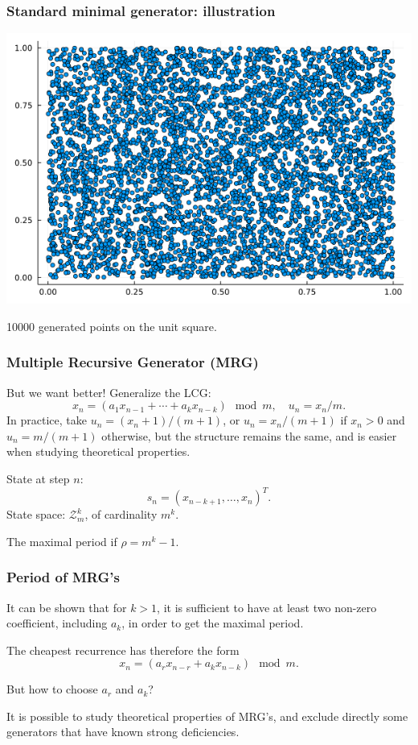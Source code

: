 \documentclass{beamer}
\begin{document}
	\begin{frame}
		\frametitle{Standard minimal generator: illustration}
		\begin{center}
			\includegraphics[width=0.8\linewidth]{imgs/lcg.png}
			
			10000 generated points on the unit square.
		\end{center}
		
	\end{frame}
	
	\begin{frame}
		\frametitle{Multiple Recursive Generator (MRG)}
		
		But we want better! Generalize the LCG:
		\[
		x_n = (a_1 x_{n-1} + \cdots + a_k x_{n-k}) \mod {m}, \quad  
		u_n = x_n / m.
		\]
		In practice, take $u_n = (x_n + 1) / (m+1)$, or $u_n =
		x_n/(m+1)$ if $x_n>0$ and $u_n = m/(m+1)$ otherwise, but the structure
		remains the same, and is easier when studying theoretical properties.
		
		\mbox{}
		
		State at step $n$:
		\[
		s_n = (x_{n-k+1},\dots,x_n)^T.
		\]
		State space: $\mathcal{Z}_m^k$, of cardinality $m^k$.
		
		\mbox{}
		
		The maximal period if $\rho = m^k-1$.
		
	\end{frame}
	
	\begin{frame}
		\frametitle{Period of MRG's}
		
		It can be shown that for $k > 1$, it is sufficient to have at least
		two non-zero coefficient, including $a_k$, in order to get the maximal
		period.
		
		\mbox{}
		
		The cheapest recurrence has therefore the form
		\[
		x_n = (a_r x_{n-r} + a_k x_{n-k}) \mod m.
		\]
		
		\mbox{}
		
		But how to choose $a_r$ and $a_k$?
		
		\mbox{}
		
		It is possible to study theoretical properties of MRG's, and exclude
		directly some generators that have known strong deficiencies.
		
	\end{frame}
	
\end{document}
